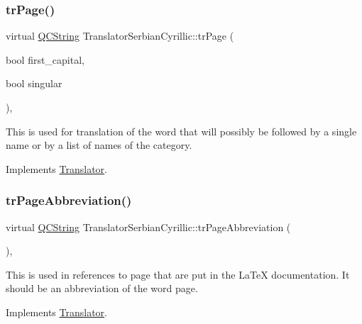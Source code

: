 \subsubsection{\texorpdfstring{trPage()}{trPage()}}
{\footnotesize\ttfamily virtual \mbox{\hyperlink{class_q_c_string}{Q\+C\+String}} Translator\+Serbian\+Cyrillic\+::tr\+Page (\begin{DoxyParamCaption}\item[{bool}]{first\+\_\+capital,  }\item[{bool}]{singular }\end{DoxyParamCaption})\hspace{0.3cm}{\ttfamily [inline]}, {\ttfamily [virtual]}}

This is used for translation of the word that will possibly be followed by a single name or by a list of names of the category. 

Implements \mbox{\hyperlink{class_translator}{Translator}}.

\mbox{\label{class_translator_serbian_cyrillic_ab4fa3b34300ff2dd5b562548f2bf50ea}} 
\subsubsection{\texorpdfstring{trPageAbbreviation()}{trPageAbbreviation()}}
{\footnotesize\ttfamily virtual \mbox{\hyperlink{class_q_c_string}{Q\+C\+String}} Translator\+Serbian\+Cyrillic\+::tr\+Page\+Abbreviation (\begin{DoxyParamCaption}{ }\end{DoxyParamCaption})\hspace{0.3cm}{\ttfamily [inline]}, {\ttfamily [virtual]}}

This is used in references to page that are put in the La\+TeX documentation. It should be an abbreviation of the word page. 

Implements \mbox{\hyperlink{class_translator}{Translator}}.

\mbox{\label{class_translator_serbian_cyrillic_a89d1781c52cef58491c9fedd064fb197}} 
